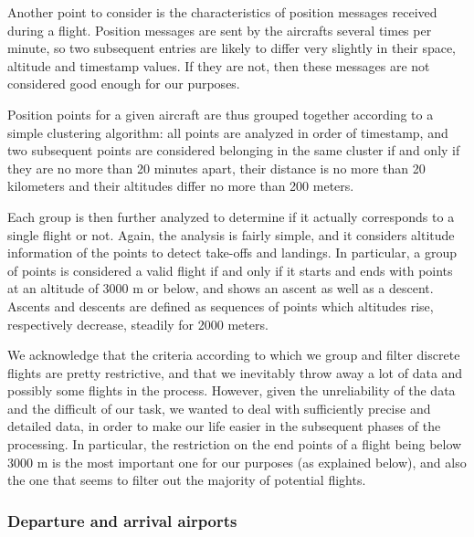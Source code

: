 \documentclass{vldb}
\begin{document}
Another point to consider is the characteristics of position messages received
during a flight. Position messages are sent by the aircrafts several times per
minute, so two subsequent entries are likely to differ very slightly in their
space, altitude and timestamp values. If they are not, then these messages are
not considered good enough for our purposes.

Position points for a given aircraft are thus grouped together according to a
simple clustering algorithm: all points are analyzed in order of timestamp, and
two subsequent points are considered belonging in the same cluster if and only
if they are no more than 20 minutes apart, their distance is no more than 20
kilometers and their altitudes differ no more than 200 meters.

Each group is then further analyzed to determine if it actually corresponds to a
single flight or not. Again, the analysis is fairly simple, and it considers
altitude information of the points to detect take-offs and landings. In
particular, a group of points is considered a valid flight if and only if it
starts and ends with points at an altitude of 3000 m or below, and shows an
ascent as well as a descent. Ascents and descents are defined as sequences of
points which altitudes rise, respectively decrease, steadily for 2000 meters.

We acknowledge that the criteria according to which we group and filter discrete
flights are pretty restrictive, and that we inevitably throw away a lot of data
and possibly some flights in the process. However, given the unreliability of
the data and the difficult of our task, we wanted to deal with sufficiently
precise and detailed data, in order to make our life easier in the subsequent
phases of the processing. In particular, the restriction on the end points of a
flight being below 3000 m is the most important one for our purposes (as
explained below), and also the one that seems to filter out the majority of
potential flights.

\subsubsection{Departure and arrival airports}
\end{document}

